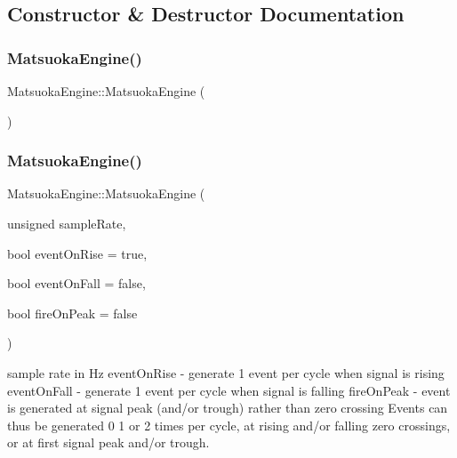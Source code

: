 \subsection{Constructor \& Destructor Documentation}
\mbox{\label{classMatsuokaEngine_a25f70ceddea44651433ea8547b332ecf}} 
\subsubsection{\texorpdfstring{Matsuoka\+Engine()}{MatsuokaEngine()}\hspace{0.1cm}{\footnotesize\ttfamily [1/3]}}
{\footnotesize\ttfamily Matsuoka\+Engine\+::\+Matsuoka\+Engine (\begin{DoxyParamCaption}{ }\end{DoxyParamCaption})}

\mbox{\label{classMatsuokaEngine_a4d26cc1bf5144ea89611377701716fea}} 
\subsubsection{\texorpdfstring{Matsuoka\+Engine()}{MatsuokaEngine()}\hspace{0.1cm}{\footnotesize\ttfamily [2/3]}}
{\footnotesize\ttfamily Matsuoka\+Engine\+::\+Matsuoka\+Engine (\begin{DoxyParamCaption}\item[{unsigned}]{sample\+Rate,  }\item[{bool}]{event\+On\+Rise = {\ttfamily true},  }\item[{bool}]{event\+On\+Fall = {\ttfamily false},  }\item[{bool}]{fire\+On\+Peak = {\ttfamily false} }\end{DoxyParamCaption})}

sample rate in Hz event\+On\+Rise -\/ generate 1 event per cycle when signal is rising event\+On\+Fall -\/ generate 1 event per cycle when signal is falling fire\+On\+Peak -\/ event is generated at signal peak (and/or trough) rather than zero crossing Events can thus be generated 0 1 or 2 times per cycle, at rising and/or falling zero crossings, or at first signal peak and/or trough. \mbox{\label{classMatsuokaEngine_ab0c8d7fd6eb27c8a8dae7e5fa3742ff9}} 
